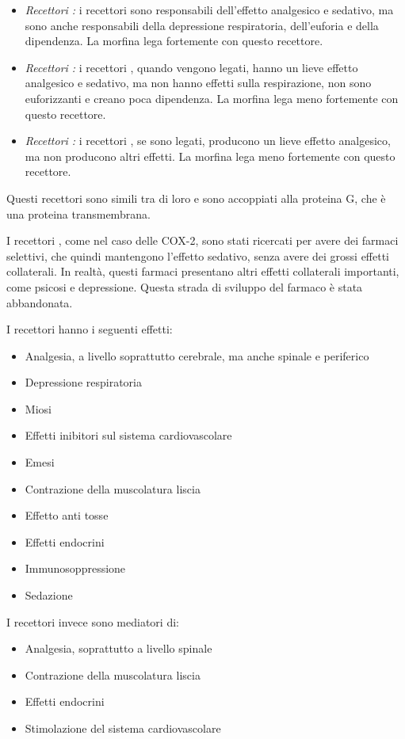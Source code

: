 \begin{itemize}
\item
  \emph{Recettori \mu:} i recettori \mu{} sono responsabili dell'effetto
  analgesico e sedativo, ma sono anche responsabili della depressione
  respiratoria, dell'euforia e della dipendenza. La morfina lega
  fortemente con questo recettore.
\item
  \emph{Recettori \kappa:} i recettori \kappa, quando vengono legati,
  hanno un lieve effetto analgesico e sedativo, ma non hanno effetti
  sulla respirazione, non sono euforizzanti e creano poca dipendenza. La
  morfina lega meno fortemente con questo recettore.
\item
  \emph{Recettori \delta:} i recettori \delta, se sono legati, producono
  un lieve effetto analgesico, ma non producono altri effetti. La
  morfina lega meno fortemente con questo recettore.
\end{itemize}

Questi recettori sono simili tra di loro e sono accoppiati alla proteina
G, che è una proteina transmembrana.

I recettori \kappa, come nel caso delle COX-2, sono stati ricercati per
avere dei farmaci selettivi, che quindi mantengono l'effetto sedativo,
senza avere dei grossi effetti collaterali. In realtà, questi farmaci
presentano altri effetti collaterali importanti, come psicosi e
depressione. Questa strada di sviluppo del farmaco è stata abbandonata.

I recettori \mu{} hanno i seguenti effetti:

\begin{itemize}
\item
  Analgesia, a livello soprattutto cerebrale, ma anche spinale e
  periferico
\item
  Depressione respiratoria
\item
  Miosi
\item
  Effetti inibitori sul sistema cardiovascolare
\item
  Emesi
\item
  Contrazione della muscolatura liscia
\item
  Effetto anti tosse
\item
  Effetti endocrini
\item
  Immunosoppressione
\item
  Sedazione
\end{itemize}

I recettori \kappa{} invece sono mediatori di:

\begin{itemize}
\item
  Analgesia, soprattutto a livello spinale
\item
  Contrazione della muscolatura liscia
\item
  Effetti endocrini
\item
  Stimolazione del sistema cardiovascolare
\end{itemize}

